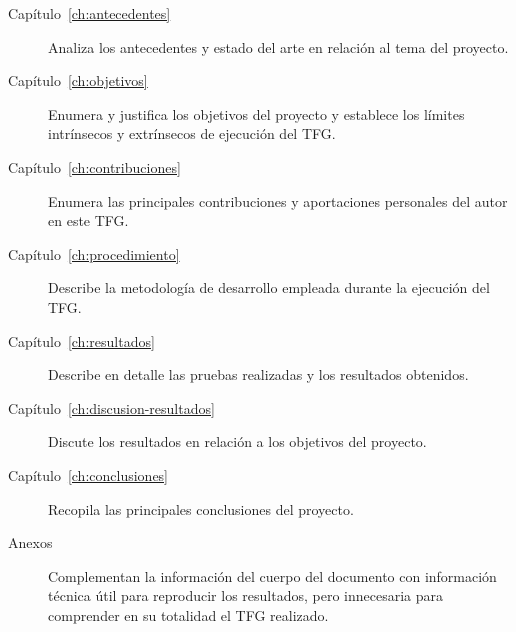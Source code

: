 \begin{description}
    \item[Capítulo~\ref{ch:antecedentes}] Analiza los antecedentes y estado del arte en relación al tema del proyecto.
    \item[Capítulo~\ref{ch:objetivos}] Enumera y justifica los objetivos del proyecto y establece los límites intrínsecos y extrínsecos de ejecución del TFG.
    \item[Capítulo~\ref{ch:contribuciones}] Enumera las principales contribuciones y aportaciones personales del autor en este TFG.
    \item[Capítulo~\ref{ch:procedimiento}] Describe la metodología de desarrollo empleada durante la ejecución del TFG.
    \item[Capítulo~\ref{ch:resultados}] Describe en detalle las pruebas realizadas y los resultados obtenidos.
    \item[Capítulo~\ref{ch:discusion-resultados}] Discute los resultados en relación a los objetivos del proyecto.
    \item[Capítulo~\ref{ch:conclusiones}] Recopila las principales conclusiones del proyecto.
    \item[Anexos] Complementan la información del cuerpo del documento con información técnica útil para reproducir los resultados, pero innecesaria para comprender en su totalidad el TFG realizado.
\end{description}


